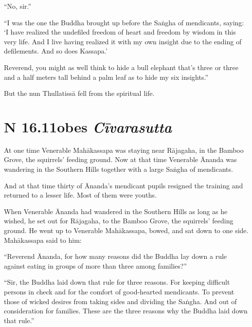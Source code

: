 \documentclass[12pt,openany]{book}%
\newcommand*{\suttatitleacronym}[1]{\smaller[2]{#1}\vspace*{.3em}}
\newcommand*{\suttatitletranslation}[1]{\linebreak{#1}}
\newcommand*{\suttatitleroot}[1]{\linebreak\smaller[2]\itshape{#1}}
\newcommand*{\tocacronym}[1]{\hspace*{-3.3em}{#1}\quad}
\newcommand*{\toctranslation}[1]{#1}
\newcommand*{\tocroot}[1]{(\textit{#1})}
\begin{document}
“No, sir.” 

“I was the one the Buddha brought up before the \textsanskrit{Saṅgha} of mendicants, saying: ‘I have realized the undefiled freedom of heart and freedom by wisdom in this very life. And I live having realized it with my own insight due to the ending of defilements. And so does Kassapa.’ 

Reverend, you might as well think to hide a bull elephant that’s three or three and a half meters tall behind a palm leaf as to hide my six insights.” 

But the nun \textsanskrit{Thullatissā} fell from the spiritual life. 

%
\section*{{\suttatitleacronym SN 16.11}{\suttatitletranslation Robes }{\suttatitleroot Cīvarasutta}}
\addcontentsline{toc}{section}{\tocacronym{SN 16.11} \toctranslation{Robes } \tocroot{Cīvarasutta}}

At one time Venerable \textsanskrit{Mahākassapa} was staying near \textsanskrit{Rājagaha}, in the Bamboo Grove, the squirrels’ feeding ground. Now at that time Venerable Ānanda was wandering in the Southern Hills together with a large \textsanskrit{Saṅgha} of mendicants. 

And at that time thirty of Ānanda’s mendicant pupils resigned the training and returned to a lesser life. Most of them were youths. 

When Venerable Ānanda had wandered in the Southern Hills as long as he wished, he set out for \textsanskrit{Rājagaha}, to the Bamboo Grove, the squirrels’ feeding ground. He went up to Venerable \textsanskrit{Mahākassapa}, bowed, and sat down to one side. \textsanskrit{Mahākassapa} said to him: 

“Reverend Ānanda, for how many reasons did the Buddha lay down a rule against eating in groups of more than three among families?” 

“Sir, the Buddha laid down that rule for three reasons. For keeping difficult persons in check and for the comfort of good-hearted mendicants. To prevent those of wicked desires from taking sides and dividing the \textsanskrit{Saṅgha}. And out of consideration for families. These are the three reasons why the Buddha laid down that rule.” 
\end{document}
